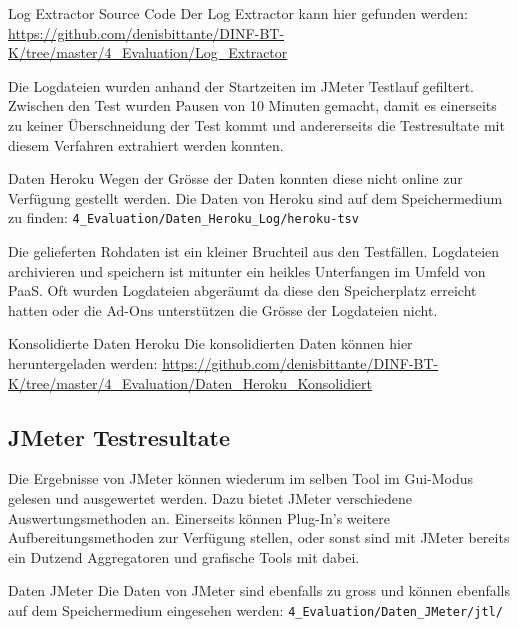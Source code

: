 \documentclass[main.tex]{subfiles}
\begin{document}
\begin{reference}{Log Extractor Source Code}
Der Log Extractor kann hier gefunden werden:  \url{https://github.com/denisbittante/DINF-BT-K/tree/master/4_Evaluation/Log_Extractor}
\end{reference}

Die Logdateien wurden anhand der Startzeiten im JMeter Testlauf gefiltert. Zwischen den Test wurden Pausen von 10 Minuten gemacht, damit es einerseits zu keiner Überschneidung der Test kommt und andererseits die Testresultate mit diesem Verfahren extrahiert werden konnten.   


\begin{reference}{Daten Heroku}
Wegen der Grösse der Daten konnten diese nicht online zur Verfügung gestellt werden. Die Daten von Heroku sind auf dem Speichermedium zu finden: 
\texttt{4\_Evaluation/Daten\_Heroku\_Log/heroku-tsv}
\end{reference}
Die gelieferten Rohdaten ist ein kleiner Bruchteil aus den Testfällen. Logdateien archivieren und speichern ist mitunter ein heikles Unterfangen im Umfeld von PaaS. Oft wurden Logdateien abgeräumt da diese den Speicherplatz erreicht hatten oder die Ad-Ons unterstützen die Grösse der Logdateien nicht.  

\begin{reference}{Konsolidierte Daten Heroku}
Die konsolidierten Daten können hier heruntergeladen werden: 
\url{https://github.com/denisbittante/DINF-BT-K/tree/master/4_Evaluation/Daten_Heroku_Konsolidiert}
\end{reference}


\subsection{JMeter Testresultate}


Die Ergebnisse von JMeter können wiederum im selben Tool im Gui-Modus gelesen und ausgewertet werden. Dazu bietet JMeter verschiedene Auswertungsmethoden an. Einerseits können Plug-In’s weitere Aufbereitungsmethoden zur Verfügung stellen, oder sonst sind mit JMeter bereits ein Dutzend Aggregatoren und grafische Tools mit dabei. 


\begin{reference}{Daten JMeter}
Die Daten von JMeter sind ebenfalls zu gross und können ebenfalls auf dem Speichermedium eingesehen werden: 
\texttt{4\_Evaluation/Daten\_JMeter/jtl/}
\end{reference}
\end{document}
